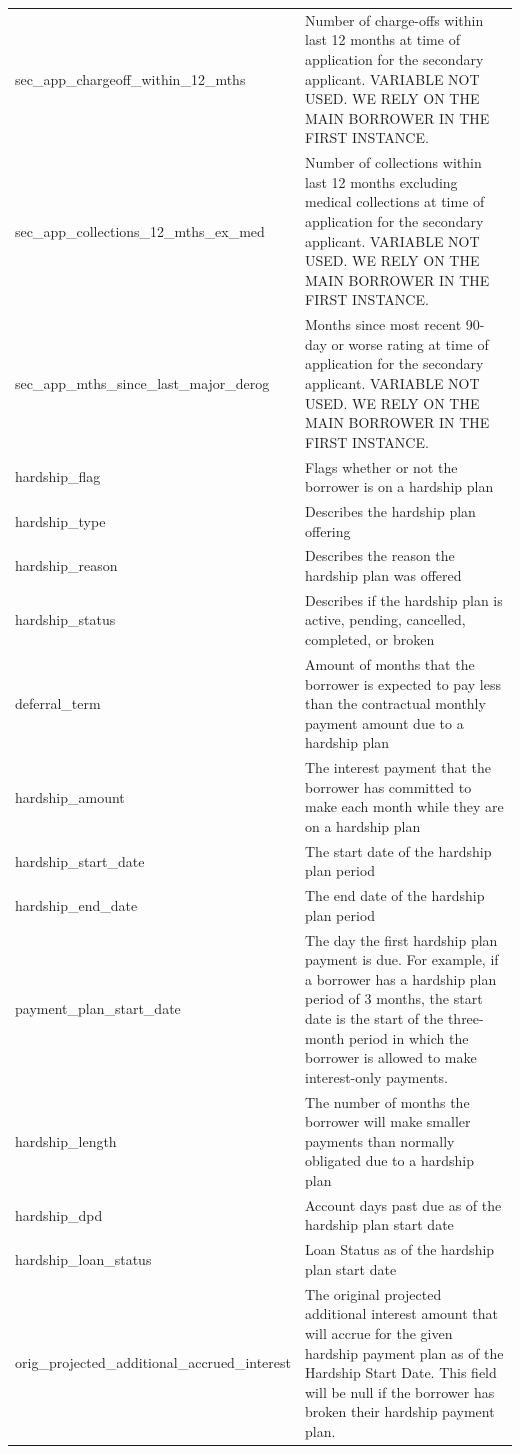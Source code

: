 \documentclass[11pt,]{report}
\begin{document}
\begin{longtable}[t]{>{\raggedright\arraybackslash}p{7cm}>{\raggedright\arraybackslash}p{7cm}}
sec\_app\_chargeoff\_within\_12\_mths & Number of charge-offs within last 12 months at time of application for the secondary applicant. VARIABLE NOT USED. WE RELY ON THE MAIN BORROWER IN THE FIRST INSTANCE.\\
sec\_app\_collections\_12\_mths\_ex\_med & Number of collections within last 12 months excluding medical collections at time of application for the secondary applicant. VARIABLE NOT USED. WE RELY ON THE MAIN BORROWER IN THE FIRST INSTANCE.\\
sec\_app\_mths\_since\_last\_major\_derog & Months since most recent 90-day or worse rating at time of application for the secondary applicant. VARIABLE NOT USED. WE RELY ON THE MAIN BORROWER IN THE FIRST INSTANCE.\\
\addlinespace
hardship\_flag & Flags whether or not the borrower is on a hardship plan\\
hardship\_type & Describes the hardship plan offering\\
hardship\_reason & Describes the reason the hardship plan was offered\\
hardship\_status & Describes if the hardship plan is active, pending, cancelled, completed, or broken\\
deferral\_term & Amount of months that the borrower is expected to pay less than the contractual monthly payment amount due to a hardship plan\\
\addlinespace
hardship\_amount & The interest payment that the borrower has committed to make each month while they are on a hardship plan\\
hardship\_start\_date & The start date of the hardship plan period\\
hardship\_end\_date & The end date of the hardship plan period\\
payment\_plan\_start\_date & The day the first hardship plan payment is due. For example, if a borrower has a hardship plan period of 3 months, the start date is the start of the three-month period in which the borrower is allowed to make interest-only payments.\\
hardship\_length & The number of months the borrower will make smaller payments than normally obligated due to a hardship plan\\
\addlinespace
hardship\_dpd & Account days past due as of the hardship plan start date\\
hardship\_loan\_status & Loan Status as of the hardship plan start date\\
orig\_projected\_additional\_accrued\_interest & The original projected additional interest amount that will accrue for the given hardship payment plan as of the Hardship Start Date. This field will be null if the borrower has broken their hardship payment plan.\\

\end{longtable}
\end{document}
